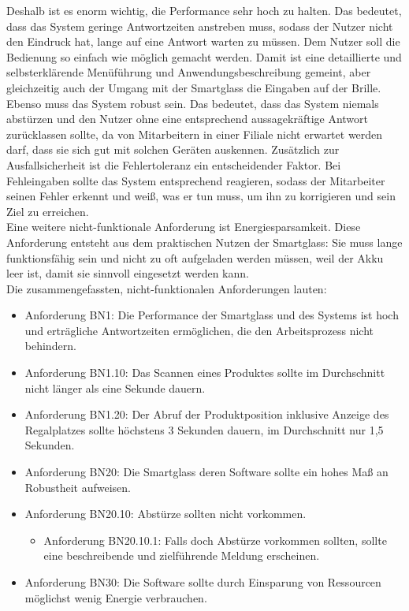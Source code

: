 Deshalb ist es enorm wichtig, die Performance sehr hoch zu halten. Das bedeutet, dass das System geringe Antwortzeiten anstreben muss, sodass der Nutzer nicht den Eindruck hat, lange auf eine Antwort warten zu müssen. 
Dem Nutzer soll die Bedienung so einfach wie möglich gemacht werden. Damit ist  eine detaillierte und selbsterklärende Menüführung und Anwendungsbeschreibung gemeint, aber gleichzeitig auch der Umgang mit der Smartglass \bzw die Eingaben auf der Brille. \\
Ebenso muss das System robust sein. Das bedeutet, dass das System niemals abstürzen und den Nutzer ohne eine entsprechend aussagekräftige Antwort zurücklassen sollte, da von Mitarbeitern in einer Filiale nicht erwartet werden darf, dass sie sich gut mit solchen Geräten auskennen. Zusätzlich zur Ausfallsicherheit ist die Fehlertoleranz ein entscheidender Faktor. Bei Fehleingaben sollte das System entsprechend reagieren, sodass der Mitarbeiter seinen Fehler erkennt und weiß, was er tun muss, um ihn zu korrigieren und sein Ziel zu erreichen. \\
Eine weitere nicht-funktionale Anforderung ist Energiesparsamkeit. Diese Anforderung entsteht aus dem praktischen Nutzen der Smartglass: Sie muss lange funktionsfähig sein und nicht zu oft aufgeladen werden müssen, weil der Akku leer ist, damit sie sinnvoll eingesetzt werden kann.\\

Die zusammengefassten, nicht-funktionalen Anforderungen lauten:
\begin{itemize}
	\item Anforderung BN1: Die Performance der Smartglass und des Systems ist hoch und erträgliche Antwortzeiten ermöglichen, die den Arbeitsprozess nicht behindern.
	\item Anforderung BN1.10: Das Scannen eines Produktes sollte im Durchschnitt nicht länger als eine Sekunde dauern.
	\item Anforderung BN1.20: Der Abruf der Produktposition inklusive Anzeige des Regalplatzes sollte höchstens 3 Sekunden dauern, im Durchschnitt nur 1,5 Sekunden.
	\item Anforderung BN20: Die Smartglass \bzw deren Software sollte ein hohes Maß an Robustheit aufweisen.
	\item Anforderung BN20.10: Abstürze sollten nicht vorkommen. 
	\begin{itemize}
		\item Anforderung BN20.10.1: Falls doch Abstürze vorkommen sollten, sollte eine beschreibende und zielführende Meldung erscheinen.
	\end{itemize}
	\item Anforderung BN30: Die Software sollte durch Einsparung von Ressourcen möglichst wenig Energie verbrauchen.
\end{itemize}

